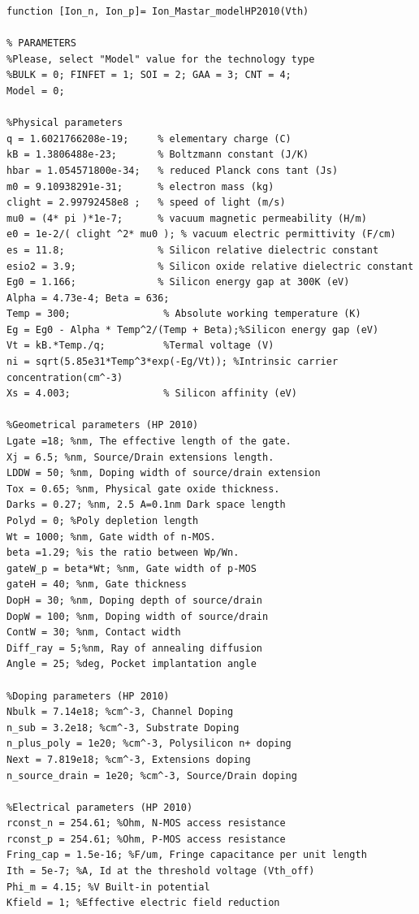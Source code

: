 \begin{lstlisting}
function [Ion_n, Ion_p]= Ion_Mastar_modelHP2010(Vth)

% PARAMETERS                
%Please, select "Model" value for the technology type
%BULK = 0; FINFET = 1; SOI = 2; GAA = 3; CNT = 4;
Model = 0; 

%Physical parameters
q = 1.6021766208e-19;     % elementary charge (C)
kB = 1.3806488e-23;       % Boltzmann constant (J/K)
hbar = 1.054571800e-34;   % reduced Planck cons tant (Js)
m0 = 9.10938291e-31;      % electron mass (kg)
clight = 2.99792458e8 ;   % speed of light (m/s)
mu0 = (4* pi )*1e-7;      % vacuum magnetic permeability (H/m)
e0 = 1e-2/( clight ^2* mu0 ); % vacuum electric permittivity (F/cm)
es = 11.8;                % Silicon relative dielectric constant
esio2 = 3.9;              % Silicon oxide relative dielectric constant
Eg0 = 1.166;              % Silicon energy gap at 300K (eV)
Alpha = 4.73e-4; Beta = 636;
Temp = 300;                % Absolute working temperature (K)
Eg = Eg0 - Alpha * Temp^2/(Temp + Beta);%Silicon energy gap (eV)
Vt = kB.*Temp./q;          %Termal voltage (V)
ni = sqrt(5.85e31*Temp^3*exp(-Eg/Vt)); %Intrinsic carrier concentration(cm^-3)
Xs = 4.003;                % Silicon affinity (eV)

%Geometrical parameters (HP 2010)
Lgate =18; %nm, The effective length of the gate.
Xj = 6.5; %nm, Source/Drain extensions length.
LDDW = 50; %nm, Doping width of source/drain extension
Tox = 0.65; %nm, Physical gate oxide thickness.
Darks = 0.27; %nm, 2.5 A=0.1nm Dark space length
Polyd = 0; %Poly depletion length
Wt = 1000; %nm, Gate width of n-MOS.
beta =1.29; %is the ratio between Wp/Wn.
gateW_p = beta*Wt; %nm, Gate width of p-MOS
gateH = 40; %nm, Gate thickness
DopH = 30; %nm, Doping depth of source/drain
DopW = 100; %nm, Doping width of source/drain
ContW = 30; %nm, Contact width
Diff_ray = 5;%nm, Ray of annealing diffusion
Angle = 25; %deg, Pocket implantation angle

%Doping parameters (HP 2010)
Nbulk = 7.14e18; %cm^-3, Channel Doping
n_sub = 3.2e18; %cm^-3, Substrate Doping
n_plus_poly = 1e20; %cm^-3, Polysilicon n+ doping
Next = 7.819e18; %cm^-3, Extensions doping
n_source_drain = 1e20; %cm^-3, Source/Drain doping

%Electrical parameters (HP 2010)
rconst_n = 254.61; %Ohm, N-MOS access resistance
rconst_p = 254.61; %Ohm, P-MOS access resistance
Fring_cap = 1.5e-16; %F/um, Fringe capacitance per unit length
Ith = 5e-7; %A, Id at the threshold voltage (Vth_off)
Phi_m = 4.15; %V Built-in potential
Kfield = 1; %Effective electric field reduction


\end{lstlisting}
